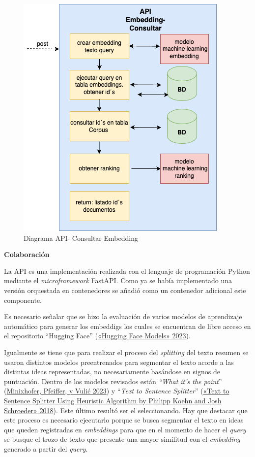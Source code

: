 \documentclass[
  12pt,
  openany]{book}
\begin{document}
\begin{enumerate}
  \begin{figure}

  {\centering \includegraphics[width=0.45\linewidth]{images/05-desarrollo/5_ciclo/diagramapiconsultar} 

  }

  \caption{Diagrama API- Consultar Embedding}\label{fig:semanticoconsultar}
  \end{figure}
\end{enumerate}

\textbf{Colaboración}

La API es una implementación realizada con el lenguaje de programación Python mediante el \emph{microframework} FastAPI. Como ya se había implementado una versión orquestada en contenedores se añadió como un contenedor adicional este componente.

Es necesario señalar que se hizo la evaluación de varios modelos de aprendizaje automático para generar los embeddigs los cuales se encuentran de libre acceso en el repositorio ``Hugging Face'' (\protect\hyperlink{ref-hfmodels2023}{{«Hugging Face Models»} 2023}).

Igualmente se tiene que para realizar el proceso del \emph{splitting} del texto resumen se usaron distintos modelos preentrenados para segmentar el texto acorde a las distintas ideas representadas, no necesariamente basándose en signos de puntuación. Dentro de los modelos revisados están \emph{``What it's the point}'' (\protect\hyperlink{ref-minixhofer-etal-2023-wheres}{Minixhofer, Pfeiffer, y Vulić 2023}) y ``\emph{Text to Sentence Splitter}'' (\protect\hyperlink{ref-sensplit22023}{{«Text to Sentence Splitter Using Heuristic Algorithm by Philipp Koehn and Josh Schroeder»} 2018}). Este último resultó ser el seleccionando. Hay que destacar que este proceso es necesario ejecutarlo porque se busca segmentar el texto en ideas que queden registradas en \emph{embeddings} para que en el momento de hacer el \emph{query} se busque el trozo de texto que presente una mayor similitud con el \emph{embedding} generado a partir del \emph{query}.
\end{document}
